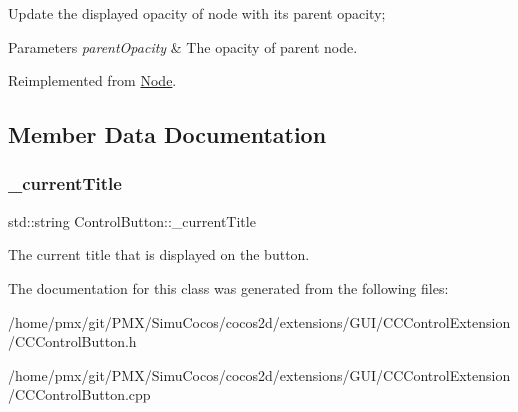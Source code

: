 Update the displayed opacity of node with it\textquotesingle{}s parent opacity; 
\begin{DoxyParams}{Parameters}
{\em parent\+Opacity} & The opacity of parent node. \\
\hline
\end{DoxyParams}


Reimplemented from \hyperlink{classNode_a3a0122884e7e1ce310b8b68abfbb245b}{Node}.



\subsection{Member Data Documentation}
\mbox{\label{classControlButton_ad2ae4a37fd0e92ff7b28dd13051ca321}} 
\subsubsection{\texorpdfstring{\+\_\+current\+Title}{\_currentTitle}}
{\footnotesize\ttfamily std\+::string Control\+Button\+::\+\_\+current\+Title\hspace{0.3cm}{\ttfamily [protected]}}

The current title that is displayed on the button. 

The documentation for this class was generated from the following files\+:\begin{DoxyCompactItemize}
\item 
/home/pmx/git/\+P\+M\+X/\+Simu\+Cocos/cocos2d/extensions/\+G\+U\+I/\+C\+C\+Control\+Extension/C\+C\+Control\+Button.\+h\item 
/home/pmx/git/\+P\+M\+X/\+Simu\+Cocos/cocos2d/extensions/\+G\+U\+I/\+C\+C\+Control\+Extension/C\+C\+Control\+Button.\+cpp\end{DoxyCompactItemize}
